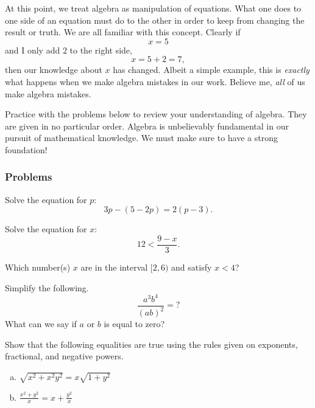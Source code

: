     At this point, we treat algebra as manipulation of equations.  What one does to one side of an equation must do to the other in order to keep from changing the result or truth.  We are all familiar with this concept.  Clearly if 
    \[
    x=5
    \]
    and I only add $2$ to the right side,
    \[
    x=5+2=7,
    \]
    then our knowledge about $x$ has changed.  Albeit a simple example, this is \emph{exactly} what happens when we make algebra mistakes in our work.  Believe me, \emph{all} of us make algebra mistakes. 
    
    Practice with the problems below to review your understanding of algebra. They are given in no particular order.  Algebra is unbelievably fundamental in our pursuit of mathematical knowledge. We must make sure to have a strong foundation! 
    
    \subsubsection{Problems}
    
    \begin{problem}
    Solve the equation for $p$:
    \[
    3p-(5-2p)=2(p-3).
    \]
    \end{problem}
    
    \begin{problem}
    Solve the equation for $x$:
    \[
    12<\frac{9-x}{3}.
    \]
    \end{problem}
    
    \begin{problem}
    Which number(s) $x$ are in the interval $[2,6)$ and satisfy $x<4$?
    \end{problem}
    
    \begin{problem}
    Simplify the following.
    \[
    \frac{a^3b^4}{(ab)^2}=?
    \]
    What can we say if $a$ or $b$ is equal to zero?
    \end{problem}
    
    \begin{problem}
    Show that the following equalities are true using the rules given on exponents, fractional, and negative powers.
    \begin{enumerate}[(a)]
        \item $\displaystyle{\sqrt{x^2+x^2y^2}=x\sqrt{1+y^2}}$
        \item $\displaystyle{\frac{x^2+y^2}{x}=x+\frac{y^2}{x}}$
    \end{enumerate}
    \end{problem}
    
